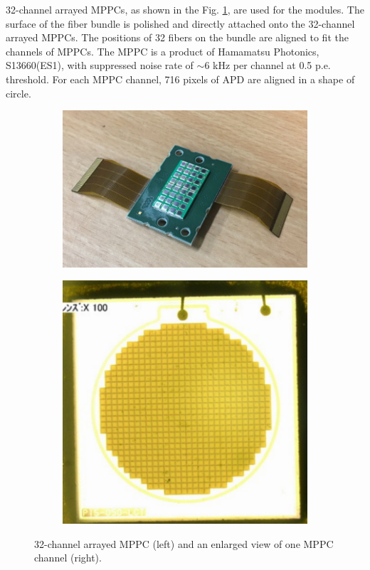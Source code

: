 32-channel arrayed MPPCs, as shown in the Fig. \ref{fig:wagasci_mppc}, are used for the modules.
The surface of the fiber bundle is polished and directly attached onto the 32-channel arrayed MPPCs. The positions of 32 fibers on the bundle are aligned to fit the channels of MPPCs.
The MPPC is a product of Hamamatsu Photonics, S13660(ES1), with suppressed noise rate of $\sim$6 kHz per channel at 0.5 p.e. threshold.
For each MPPC channel, 716 pixels of APD are aligned in a shape of circle.

\begin{figure}[tbhp]
  \begin{center}
   \begin{subfigure}{0.48\textwidth}
     \includegraphics[width=\linewidth]{fig/32ch_array_mppc.pdf}
    \end{subfigure}
  \begin{subfigure}{0.38\textwidth}
      \includegraphics[width=\linewidth]{fig/enlarge_32ch_array_mppc.pdf}
    \end{subfigure}    
    \end{center}
  \caption{32-channel arrayed MPPC (left) and an enlarged view of one MPPC channel (right).}
\label{fig:wagasci_mppc}
\end{figure}


